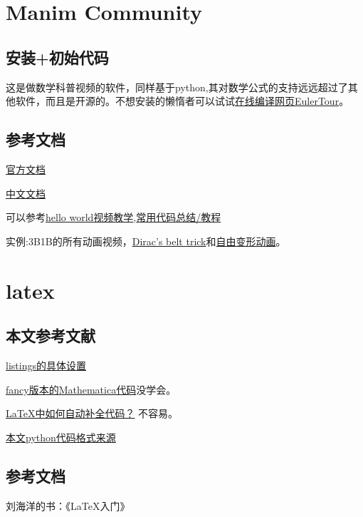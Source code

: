 \documentclass[11pt]{amsart}
\begin{document}
\section{Manim Community}
\subsection{安装+初始代码}
这是做数学科普视频的软件，同样基于python,其对数学公式的支持远远超过了其他软件，而且是开源的。不想安装的懒惰者可以试试\href{https://eulertour.com/lab}{在线编译网页EulerTour}。
\subsection{参考文档}
\href{https://3b1b.github.io/manim/}{官方文档}

\href{https://docs.manim.org.cn/}{中文文档}

可以参考\href{https://www.bilibili.com/video/BV1KD4y1D7xD}{hello world视频教学},\href{https://www.bilibili.com/video/BV1p54y197cC}{常用代码总结/教程} 

实例:3B1B的所有动画视频，\href{https://www.youtube.com/watch?v=ACZC_XEyg9U&list=PLnQX-jgAF5pTkwtUuVpqS5tuWmJ-6ZM-Z&index=10}{Dirac's belt trick}和\href{https://www.bilibili.com/video/BV1sK4y1V7TE}{自由变形动画}。

\section{latex} 

\subsection{本文参考文献}

 \href{http://blog.sina.com.cn/s/blog_a382a9080102z25i.html}{listings的具体设置}
  
   \href{https://tex.stackexchange.com/questions/84748/fanciest-way-to-include-mathematica-code-in-latex}{fancy版本的Mathematica代码}没学会。
           
\href{https://tex.stackexchange.com/questions/126241/autoindent-in-texmaker}{\LaTeX 中如何自动补全代码？} 不容易。

\href{https://tex.stackexchange.com/questions/235783/listings-recognize-numbers-and-1e-3}{本文python代码格式来源}

\subsection{参考文档}
刘海洋的书：《\LaTeX 入门》
\end{document}
